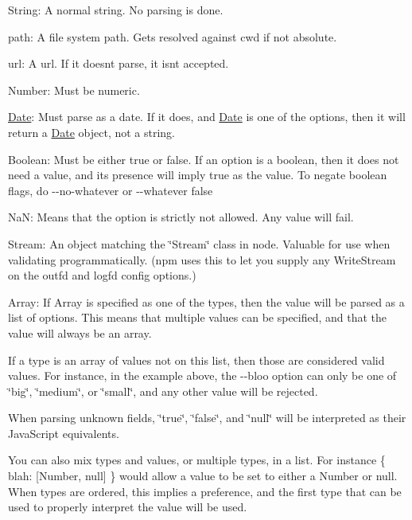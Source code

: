 \begin{DoxyItemize}
\item String\+: A normal string. No parsing is done.
\item path\+: A file system path. Gets resolved against cwd if not absolute.
\item url\+: A url. If it doesn\textquotesingle{}t parse, it isn\textquotesingle{}t accepted.
\item Number\+: Must be numeric.
\item \mbox{\hyperlink{classDate}{Date}}\+: Must parse as a date. If it does, and {\ttfamily \mbox{\hyperlink{classDate}{Date}}} is one of the options, then it will return a \mbox{\hyperlink{classDate}{Date}} object, not a string.
\item Boolean\+: Must be either {\ttfamily true} or {\ttfamily false}. If an option is a boolean, then it does not need a value, and its presence will imply {\ttfamily true} as the value. To negate boolean flags, do {\ttfamily -\/-\/no-\/whatever} or {\ttfamily -\/-\/whatever false}
\item NaN\+: Means that the option is strictly not allowed. Any value will fail.
\item Stream\+: An object matching the \char`\"{}\+Stream\char`\"{} class in node. Valuable for use when validating programmatically. (npm uses this to let you supply any Write\+Stream on the {\ttfamily outfd} and {\ttfamily logfd} config options.)
\item Array\+: If {\ttfamily Array} is specified as one of the types, then the value will be parsed as a list of options. This means that multiple values can be specified, and that the value will always be an array.
\end{DoxyItemize}

If a type is an array of values not on this list, then those are considered valid values. For instance, in the example above, the {\ttfamily -\/-\/bloo} option can only be one of {\ttfamily \char`\"{}big\char`\"{}}, {\ttfamily \char`\"{}medium\char`\"{}}, or {\ttfamily \char`\"{}small\char`\"{}}, and any other value will be rejected.

When parsing unknown fields, {\ttfamily \char`\"{}true\char`\"{}}, {\ttfamily \char`\"{}false\char`\"{}}, and {\ttfamily \char`\"{}null\char`\"{}} will be interpreted as their Java\+Script equivalents.

You can also mix types and values, or multiple types, in a list. For instance {\ttfamily \{ blah\+: \mbox{[}Number, null\mbox{]} \}} would allow a value to be set to either a Number or null. When types are ordered, this implies a preference, and the first type that can be used to properly interpret the value will be used.

